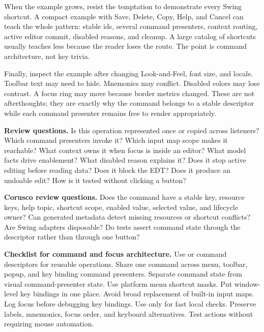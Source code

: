 When the example grows, resist the temptation to demonstrate every Swing
shortcut. A compact example with Save, Delete, Copy, Help, and Cancel can teach
the whole pattern: stable ids, several command presenters, context routing, active
editor commit, disabled reasons, and cleanup. A large catalog of shortcuts
usually teaches less because the reader loses the route. The point is command
architecture, not key trivia.

Finally, inspect the example after changing Look-and-Feel, font size, and
locale. Toolbar text may need to hide. Mnemonics may conflict. Disabled colors
may lose contrast. A focus ring may move because border metrics changed. These
are not afterthoughts; they are exactly why the command belongs to a stable
descriptor while each command presenter remains free to render appropriately.

\textbf{Review questions.} Is this operation represented once or copied across listeners? Which command presenters invoke it? Which input map scope makes it reachable? What context owns it when focus is inside an editor? What model facts drive enablement? What disabled reason explains it? Does it stop active editing before reading data? Does it block the EDT? Does it produce an undoable edit? How is it tested without clicking a button?

\textbf{Corusco review questions.} Does the command have a stable key, resource keys, help topic, shortcut scope, enabled value, selected value, and lifecycle owner? Can generated metadata detect missing resources or shortcut conflicts? Are Swing adapters disposable? Do tests assert command state through the descriptor rather than through one button?

\textbf{Checklist for command and focus architecture.} Use  or command descriptors for reusable operations. Share one command across menu, toolbar, popup, and key binding command presenters. Separate command state from visual command-presenter state. Use platform menu shortcut masks. Put window-level key bindings in one place. Avoid broad replacement of built-in input maps. Log focus before debugging key bindings. Use  only for fast local checks. Preserve labels, mnemonics, focus order, and keyboard alternatives. Test actions without requiring mouse automation.

